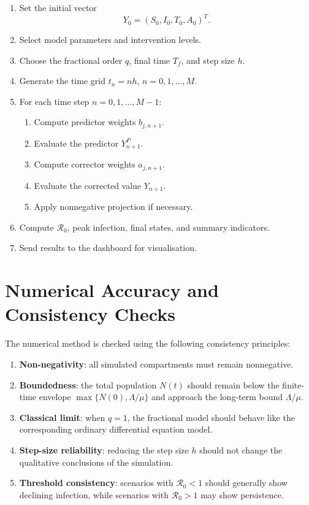 \documentclass[12pt,a4paper,oneside]{report}
\newcommand{\Rzero}{\mathcal{R}_0}
\begin{document}
\begin{resultbox}[title={Algorithm: Fractional ABM Simulation for the SITA Model}]
\begin{enumerate}
  \item Set the initial vector
  \[
  Y_0=(S_0,I_0,T_0,A_0)^T.
  \]
  \item Select model parameters and intervention levels.
  \item Choose the fractional order $q$, final time $T_f$, and step size $h$.
  \item Generate the time grid $t_n=nh$, $n=0,1,\ldots,M$.
  \item For each time step $n=0,1,\ldots,M-1$:
  \begin{enumerate}
    \item Compute predictor weights $b_{j,n+1}$.
    \item Evaluate the predictor $Y_{n+1}^{P}$.
    \item Compute corrector weights $a_{j,n+1}$.
    \item Evaluate the corrected value $Y_{n+1}$.
    \item Apply nonnegative projection if necessary.
  \end{enumerate}
  \item Compute $\Rzero$, peak infection, final states, and summary indicators.
  \item Send results to the dashboard for visualisation.
\end{enumerate}
\end{resultbox}

\section{Numerical Accuracy and Consistency Checks}

The numerical method is checked using the following consistency principles:
\begin{enumerate}
  \item \textbf{Non-negativity}: all simulated compartments must remain nonnegative.
  \item \textbf{Boundedness}: the total population $N(t)$ should remain below the finite-time envelope
  $\max\{N(0),\Lambda/\mu\}$ and approach the long-term bound $\Lambda/\mu$.
  \item \textbf{Classical limit}: when $q=1$, the fractional model should behave like the corresponding ordinary differential equation model.
  \item \textbf{Step-size reliability}: reducing the step size $h$ should not change the qualitative conclusions of the simulation.
  \item \textbf{Threshold consistency}: scenarios with $\Rzero<1$ should generally show declining infection, while scenarios with $\Rzero>1$ may show persistence.
\end{enumerate}
\end{document}
